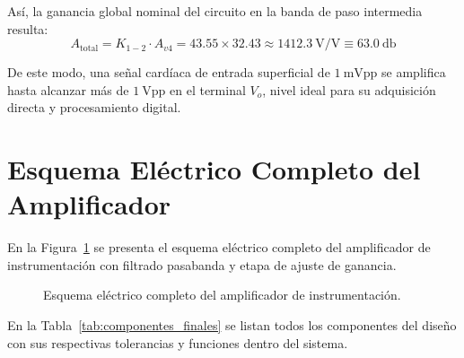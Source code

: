 Así, la ganancia global nominal del circuito en la banda de paso intermedia resulta:
\begin{equation*}
  A_{\text{total}} = K_{1-2} \cdot A_{v4} = 43.55 \times 32.43 \approx 1412.3\ \text{V/V} \equiv \SI{63.0}{\decibel}
\end{equation*}

De este modo, una señal cardíaca de entrada superficial de $\SI{1}{\milli\volt\text{pp}}$ se amplifica hasta alcanzar más de $\SI{1}{\volt\text{pp}}$ en el terminal $V_o$, nivel ideal para su adquisición directa y procesamiento digital.

\section{Esquema Eléctrico Completo del Amplificador}

En la Figura~\ref{crkt:amplificador_completo} se presenta el esquema eléctrico completo del amplificador de
instrumentación con filtrado pasabanda y etapa de ajuste de ganancia.
\begin{figure}[!ht]
  \centering
  \resizebox{0.98\textwidth}{!}{%
  }
  \caption{Esquema eléctrico completo del amplificador de instrumentación.}
  \label{crkt:amplificador_completo}
\end{figure}

En la Tabla~\ref{tab:componentes_finales} se listan todos los componentes del diseño con sus respectivas tolerancias y
funciones dentro del sistema.

